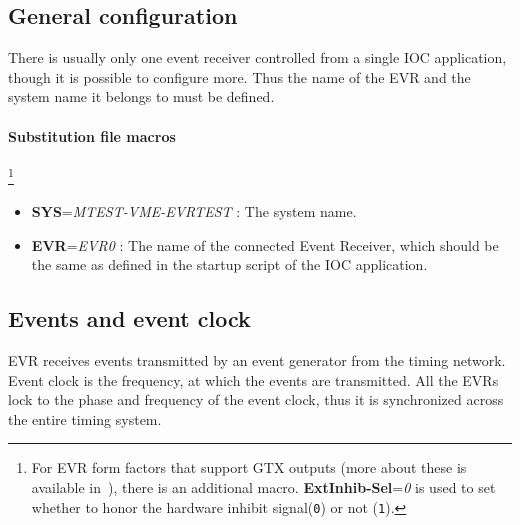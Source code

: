 \documentclass[12pt,a4paper]{article}
\begin{document}
\subsection{General configuration}
There is usually only one event receiver controlled from a single IOC application, though it is possible to configure more. Thus the name of the EVR and the system name it belongs to must be defined.

\paragraph{Substitution file macros}\footnote{For EVR form factors that support GTX outputs (more about these is available in~\cite{mrm_evr}), there is an additional macro. \textbf{ExtInhib-Sel}=\emph{0} is used to set whether to honor the hardware inhibit signal(\texttt{0}) or not (\texttt{1}).}
\begin{itemize}
\item
	\textbf{SYS}=\emph{MTEST-VME-EVRTEST} : The system name. 
\item
	\textbf{EVR}=\emph{EVR0} : The name of the connected Event Receiver, which should be the same as defined in the startup script of the IOC application. 
\end{itemize}




\subsection{Events and event clock}\label{sec:Events and event clock}
EVR receives events transmitted by an event generator from the timing network. Event clock is the frequency, at which the events are transmitted. All the EVRs lock to the phase and frequency of the event clock, thus it is synchronized across the entire timing system.
\end{document}
